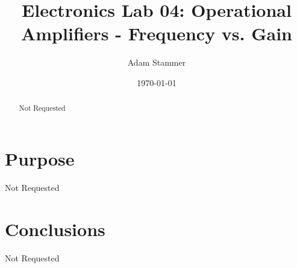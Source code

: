 \documentclass[prb,preprint]{revtex4-1}
\begin{document}
\title{Electronics Lab 04: Operational Amplifiers - Frequency vs. Gain}
\author{Adam Stammer}

\date{\today}

\begin{abstract}
Not Requested
\end{abstract}

\maketitle


%
%
%
%
%
%
%
%

\section{Purpose}

Not Requested  

\section{Conclusions}
Not Requested
\end{document}
